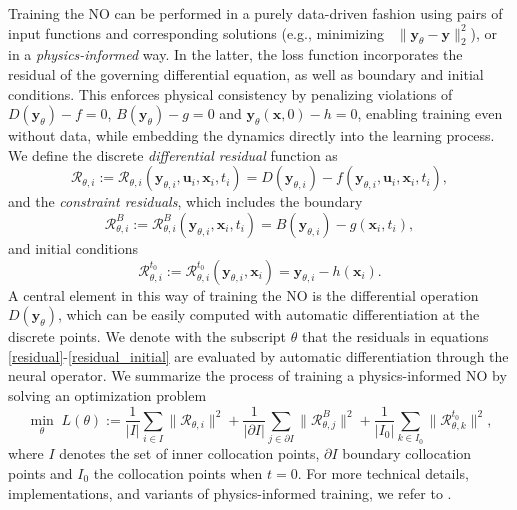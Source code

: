 \documentclass[final,1p,times]{elsarticle}
\theoremstyle{plain} %
\theoremstyle{definition} %
\theoremstyle{remark} %
\begin{document}
Training the NO can be performed in a purely data-driven fashion using pairs of input functions and corresponding solutions (e.g., minimizing \ $\|\mathbf{y}_\theta-\mathbf{y}\|_2^2$), or in a \textit{physics-informed} way. In the latter, the loss function incorporates the residual of the governing differential equation, as well as boundary and initial conditions. This enforces physical consistency by penalizing violations of $D(\mathbf{y}_\theta)-f=0$, $B(\mathbf{y}_\theta)-g=0$ and $\mathbf{y}_\theta(\mathbf{x},0)-h=0$, enabling training even without data, while embedding the dynamics directly into the learning process. We define the discrete \textit{differential residual} function  as
\begin{equation}\label{residual}
\mathcal{R}_{\theta,i} :=\mathcal{R}_{\theta,i}(\mathbf{y}_{\theta,i},\mathbf{u}_{i},\mathbf{x}_i,t_i)= D(\mathbf{y}_{\theta,i}) - f(\mathbf{y}_{\theta,i}, \mathbf{u}_{i}, \mathbf{x}_i,t_i),
\end{equation}
and the \textit{constraint residuals}, which includes the boundary 
\begin{equation}\label{residual_boundary}
\mathcal{R}_{\theta,i}^B :=\mathcal{R}_{\theta,i}^B(\mathbf{y}_{\theta,i},\mathbf{x}_i,t_i)= B(\mathbf{y}_{\theta,i}) -g(\mathbf{x}_i,t_i), 
\end{equation}
and initial conditions
\begin{equation}\label{residual_initial}
\mathcal{R}_{\theta,i}^{t_0} :=\mathcal{R}_{\theta,i}^{t_0}(\mathbf{y}_{\theta,i},\mathbf{x}_i) =\mathbf{y}_{\theta,i} -h(\mathbf{x}_i). 
\end{equation}
A central element in this way of training the NO is the differential operation $D(\mathbf{y}_{\theta})$, which can be easily computed with automatic differentiation at the discrete points. We denote with the subscript $\theta$ that the residuals in equations \eqref{residual}-\eqref{residual_initial} are evaluated by automatic differentiation through the neural operator. We summarize the process of training a physics-informed NO by solving an optimization problem
%
\begin{equation}\label{physics_informed_training}
\min_{\theta} \; L(\theta):=\frac{1}{|I|}\sum_{i\in I} \|\mathcal{R}_{\theta,i}\|^2+ \frac{1}{|\partial I|}\sum_{j\in \partial I}\|\mathcal{R}^B_{\theta,j}\|^2 + \frac{1}{|I_0|}\sum_{k\in I_0}\|\mathcal{R}^{t_0}_{\theta,k}\|^2,
\end{equation}
where $I$ denotes the set of inner collocation points, $\partial I$ boundary collocation points and $I_0$ the collocation points when $t=0$. For more technical details, implementations, and variants of physics-informed training, we refer to \cite{raissi2017physics,raissi2019physics,wang2021learning}.
\end{document}
